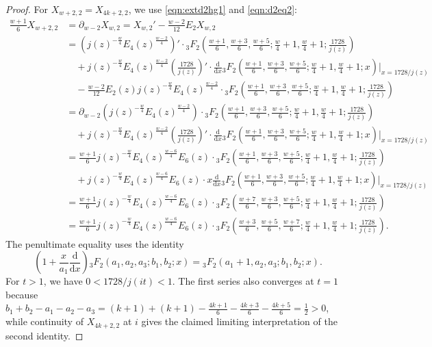 \documentclass[10pt,reqno]{amsproc}
\newcommand{\dd}{\mathrm{d}}
\newcommand{\1}{\mathds{1}}	%
\theoremstyle{definition}
\theoremstyle{remark}
\begin{document}
\begin{proof}
For $X_{w + 2, 2} = X_{4k+2,2}$, we use \eqref{eqn:extd2hg1} and \eqref{eqn:d2eq2}:
\begin{align*}
    \frac{w+1}{6} X_{w+2, 2} &= \partial_{w-2} X_{w, 2} = X_{w, 2}' - \frac{w-2}{12} E_2 X_{w, 2} \\
    &= (j(z)^{-\frac{w}{4}} E_4(z)^{\frac{w-2}{4}})' \cdot {}_{3}F_{2}\left(\frac{w+1}{6},\frac{w+3}{6},\frac{w+5}{6}; \frac{w}{4} + 1, \frac{w}{4} + 1; \frac{1728}{j(z)}\right) \\
    &\quad+ j(z)^{-\frac{w}{4}} E_4(z)^{\frac{w-2}{4}} \left(\frac{1728}{j(z)}\right)' \cdot \frac{\dd}{\dd x} {}_{3}F_{2}\left(\frac{w+1}{6},\frac{w+3}{6},\frac{w+5}{6}; \frac{w}{4} + 1, \frac{w}{4} + 1; x\right) \bigg|_{x = 1728 / j(z)} \\
    &\quad - \frac{w-2}{12} E_2(z) j(z)^{-\frac{w}{4}} E_4(z)^{\frac{w-2}{4}} \cdot {}_{3}F_{2}\left(\frac{w+1}{6},\frac{w+3}{6},\frac{w+5}{6}; \frac{w}{4} + 1, \frac{w}{4} + 1; \frac{1728}{j(z)}\right) \\
    &= \partial_{w-2} (j(z)^{-\frac{w}{4}} E_4(z)^{\frac{w-2}{4}}) \cdot {}_{3}F_{2}\left(\frac{w+1}{6},\frac{w+3}{6},\frac{w+5}{6}; \frac{w}{4} + 1, \frac{w}{4} + 1; \frac{1728}{j(z)}\right) \\
    &\quad + j(z)^{-\frac{w}{4}} E_4(z)^{\frac{w-2}{4}} \left(\frac{1728}{j(z)}\right)' \cdot \frac{\dd}{\dd x} {}_{3}F_{2}\left(\frac{w+1}{6},\frac{w+3}{6},\frac{w+5}{6}; \frac{w}{4} + 1, \frac{w}{4} + 1; x\right) \bigg|_{x = 1728 / j(z)} \\
    &= \frac{w+1}{6} j(z)^{-\frac{w}{4}} E_4(z)^{\frac{w-6}{4}} E_6(z) \cdot {}_{3}F_{2} \left(\frac{w+1}{6},\frac{w+3}{6},\frac{w+5}{6}; \frac{w}{4} + 1, \frac{w}{4} + 1; \frac{1728}{j(z)}\right) \\
    &\quad + j(z)^{-\frac{w}{4}} E_4(z)^{\frac{w-6}{4}} E_6(z) \cdot x\frac{\dd}{\dd x} {}_{3}F_{2}\left(\frac{w+1}{6},\frac{w+3}{6},\frac{w+5}{6}; \frac{w}{4} + 1, \frac{w}{4} + 1; x\right) \bigg|_{x = 1728 / j(z)} \\
    &= \frac{w+1}{6} j(z)^{-\frac{w}{4}} E_4(z)^{\frac{w-6}{4}} E_6(z) \cdot {}_{3}F_{2} \left(\frac{w+7}{6},\frac{w+3}{6},\frac{w+5}{6}; \frac{w}{4} + 1, \frac{w}{4} + 1; \frac{1728}{j(z)}\right) \\
    &= \frac{w+1}{6} j(z)^{-\frac{w}{4}} E_4(z)^{\frac{w-6}{4}} E_6(z) \cdot {}_{3}F_{2} \left(\frac{w+3}{6},\frac{w+5}{6},\frac{w+7}{6}; \frac{w}{4} + 1, \frac{w}{4} + 1; \frac{1728}{j(z)}\right).
\end{align*}
The penultimate equality uses the identity
\[
\left(1 + \frac{x}{a_1} \frac{\dd}{\dd x}\right) {}_{3}F_{2}(a_1, a_2, a_3; b_1, b_2; x) = {}_{3}F_{2}(a_1 + 1, a_2, a_3; b_1, b_2; x).
\]
For $t>1$, we have $0<1728/j(it)<1$. The first series also converges at $t=1$ because $b_1 + b_2 - a_1 - a_2 - a_3 = (k + 1) + (k + 1) - \frac{4k+1}{6} - \frac{4k+3}{6} - \frac{4k+5}{6} = \frac{1}{2} > 0$, while continuity of $X_{4k+2,2}$ at $i$ gives the claimed limiting interpretation of the second identity.
\end{proof}
\end{document}
